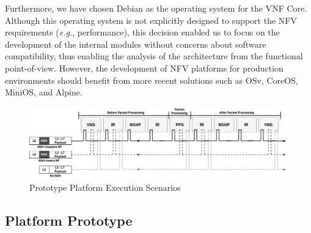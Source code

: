 \begin{itemize}
\end{itemize}

Furthermore, we have chosen Debian as the operating system for the VNF Core. Although this operating system is not explicitly designed to support the NFV requirements (\textit{e.g.}, performance), this decision enabled us to focus on the development of the internal modules without concerns about software compatibility, thus enabling the analysis of the architecture from the functional point-of-view. However, the development of NFV platforms for production environments should benefit from more recent solutions such as  OSv, CoreOS, MiniOS, and Alpine.


\begin{figure}[ht]
\centering
\includegraphics[width=\textwidth]{images/PlatformFlow.png}
\caption{Prototype Platform Execution Scenarios}
\label{FIG:PLATEXEC}
\end{figure}

\subsection{Platform Prototype}


